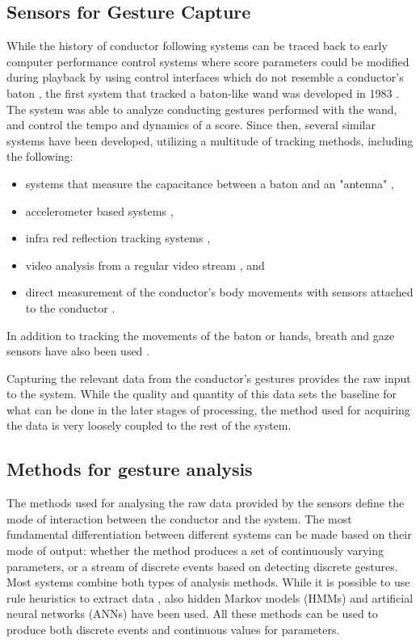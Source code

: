\subsection{Sensors for Gesture Capture}

While the history of conductor following systems
can be traced back to
early computer performance control systems
where score parameters could be modified during playback
by using control interfaces which do not resemble a conductor's baton \cite{},
the first system that tracked a baton-like wand
was developed in 1983 \cite{}.
The system was able to analyze conducting gestures performed with the wand,
and control the tempo and dynamics of a score.
Since then, several similar systems have been developed,
utilizing a multitude of tracking methods,
including the following:
\begin{itemize}
\item systems that measure the capacitance between a baton and an "antenna" \cite{},
\item accelerometer based systems \cite{},
\item infra red reflection tracking systems \cite{},
\item video analysis from a regular video stream \cite{}, and
\item direct measurement of the conductor's body movements with
sensors attached to the conductor \cite{}.
\end{itemize}
In addition to tracking the movements of the baton or hands,
breath and gaze sensors have also been used \cite{}.

Capturing the relevant data from the conductor's gestures
provides the raw input to the system.
While the quality and quantity of this data
sets the baseline for what can be done
in the later stages of processing,
the method used for acquiring the data
is very loosely coupled to the rest of the system.

\subsection{Methods for gesture analysis}

The methods used for analysing the raw data
provided by the sensors define the
mode of interaction between the conductor and the system.
The most fundamental differentiation between different systems
can be made based on their mode of output:
whether the method produces
a set of continuously varying parameters,
or a stream of discrete events based on detecting discrete gestures.
Most systems combine both types of analysis methods.
While it is possible to use
rule heuristics to extract data \cite{},
also hidden Markov models (HMMs) \cite{} and
artificial neural networks (ANNs) \cite{}
have been used.
All these methods can be used to produce both discrete events
and continuous values for parameters.

